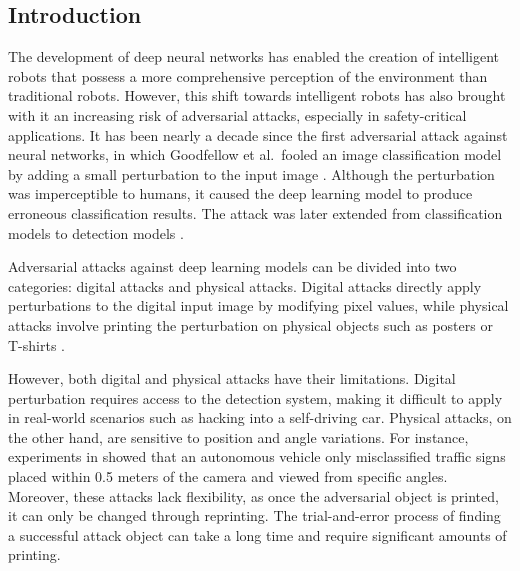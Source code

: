 
\subsection{Introduction}

The development of deep neural networks has enabled the creation of intelligent robots that possess a more comprehensive perception of the environment than traditional robots. However, this shift towards intelligent robots has also brought with it an increasing risk of adversarial attacks, especially in safety-critical applications. It has been nearly a decade since the first adversarial attack against neural networks, in which Goodfellow et al.\ fooled an image classification model by adding a small perturbation to the input image \cite{GoodfellowSS14}. Although the perturbation was imperceptible to humans, it caused the deep learning model to produce erroneous classification results. The attack was later extended from classification models to detection models \cite{LuSFF17}. 


Adversarial attacks against deep learning models can be divided into two categories: digital attacks and physical attacks. Digital attacks directly apply perturbations to the digital input image by modifying pixel values, while physical attacks involve printing the perturbation on physical objects such as posters \cite{lee2019physical} or T-shirts \cite{xu2020adversarial}.

However, both digital and physical attacks have their limitations. Digital perturbation requires access to the detection system, making it difficult to apply in real-world scenarios such as hacking into a self-driving car. Physical attacks, on the other hand, are sensitive to position and angle variations. For instance, experiments in \cite{LuSFF17} showed that an autonomous vehicle only misclassified traffic signs placed within 0.5 meters of the camera and viewed from specific angles. Moreover, these attacks lack flexibility, as once the adversarial object is printed, it can only be changed through reprinting. The trial-and-error process of finding a successful attack object can take a long time and require significant amounts of printing.

